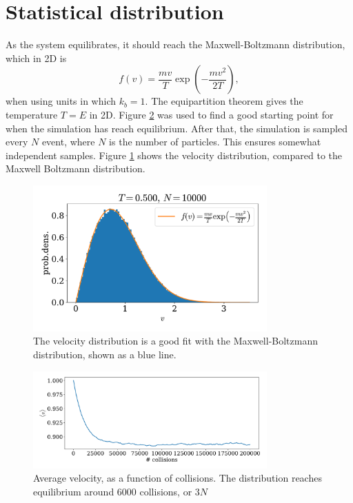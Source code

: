 \documentclass{article}
\begin{document}
        \section*{Statistical distribution}
            As the system equilibrates, it should reach the Maxwell-Boltzmann distribution, which in 2D is
            \begin{equation*}
                f(v) = \frac{m v}{T} \exp \left(-\frac{m v^2}{2 T}\right),
            \end{equation*}
            when using units in which $k_b = 1$. The equipartition theorem gives the temperature $T = E$ in 2D. Figure \ref{problem1 av vel} was used to find a good starting point for when the simulation has reach equilibrium. After that, the simulation is sampled every $N$ event, where $N$ is the number of particles. This ensures somewhat independent samples. Figure \ref{problem1 dist} shows the velocity distribution, compared to the Maxwell Boltzmann distribution. 
            \begin{figure}
                \centering
                \includegraphics[width=0.8\textwidth]{../plots/problem1/vel_dist.pdf}
                \caption{The velocity distribution is a good fit with the Maxwell-Boltzmann distribution, shown as a blue line.}
                \label{problem1 dist}
            \end{figure}
            \begin{figure}
                \centering
                \includegraphics[width=0.8\textwidth]{../plots/problem1/v_av.pdf}
                \caption{Average velocity, as a function of collisions. The distribution reaches equilibrium around $6000$ collisions, or $3N$}
                \label{problem1 av vel}
            \end{figure}
\end{document}
